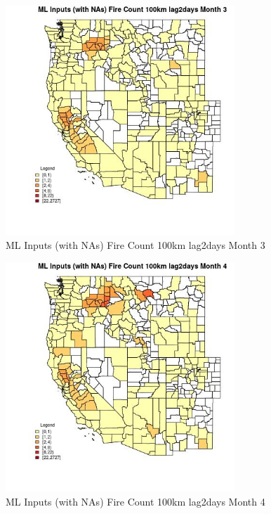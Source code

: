 \begin{figure} 
\centering  
\includegraphics[width=0.77\textwidth]{Code_Outputs/Report_ML_input_PM25_Step4_part_f_de_duplicated_aves_prioritize_24hr_obswNAs_CountyFire_Count_100km_lag2daysmedianMonth3.jpg} 
\caption{\label{fig:Report_ML_input_PM25_Step4_part_f_de_duplicated_aves_prioritize_24hr_obswNAsCountyFire_Count_100km_lag2daysmedianMonth3}ML Inputs (with NAs) Fire Count 100km lag2days Month 3} 
\end{figure} 
 

\begin{figure} 
\centering  
\includegraphics[width=0.77\textwidth]{Code_Outputs/Report_ML_input_PM25_Step4_part_f_de_duplicated_aves_prioritize_24hr_obswNAs_CountyFire_Count_100km_lag2daysmedianMonth4.jpg} 
\caption{\label{fig:Report_ML_input_PM25_Step4_part_f_de_duplicated_aves_prioritize_24hr_obswNAsCountyFire_Count_100km_lag2daysmedianMonth4}ML Inputs (with NAs) Fire Count 100km lag2days Month 4} 
\end{figure} 
 

